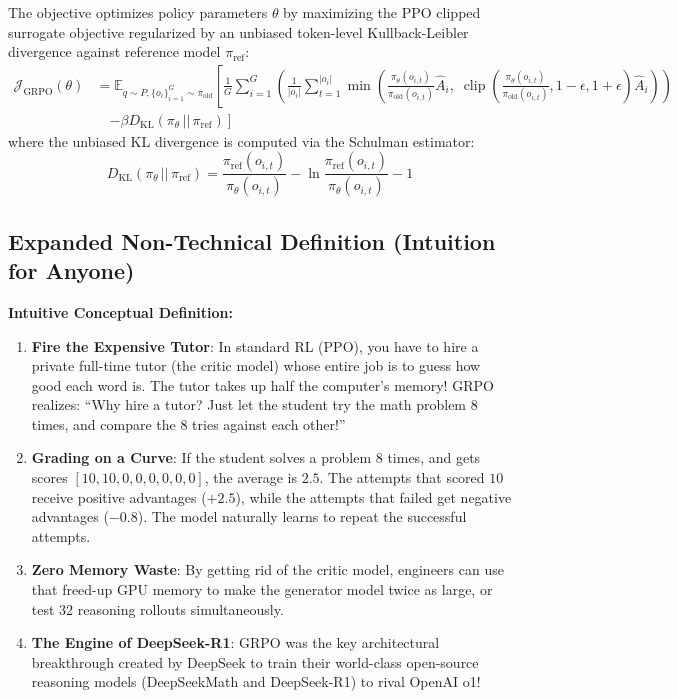 \documentclass[11pt,a4paper]{article}
\theoremstyle{definition}
\begin{document}
The objective optimizes policy parameters $\theta$ by maximizing the PPO clipped surrogate objective regularized by an unbiased token-level Kullback-Leibler divergence against reference model $\pi_{\text{ref}}$:
{\boldmath
\begin{align}
\mathcal{J}_{\text{GRPO}}(\theta) &= \mathbb{E}_{q \sim P, \{o_i\}_{i=1}^G \sim \pi_{\text{old}}} \left[ \frac{1}{G}\sum_{i=1}^G \left( \frac{1}{|o_i|}\sum_{t=1}^{|o_i|} \min\left( \frac{\pi_\theta(o_{i, t})}{\pi_{\text{old}}(o_{i, t})} \hat{A}_i, \; \operatorname{clip}\left(\frac{\pi_\theta(o_{i, t})}{\pi_{\text{old}}(o_{i, t})}, 1 - \epsilon, 1 + \epsilon\right) \hat{A}_i \right) \right) \right. \nonumber \\
&\quad \left. - \beta D_{\text{KL}}(\pi_\theta \,||\, \pi_{\text{ref}}) \right]
\end{align}
}
where the unbiased KL divergence is computed via the Schulman estimator:
{\boldmath
\begin{equation}
D_{\text{KL}}(\pi_\theta \,||\, \pi_{\text{ref}}) = \frac{\pi_{\text{ref}}(o_{i, t})}{\pi_\theta(o_{i, t})} - \ln \frac{\pi_{\text{ref}}(o_{i, t})}{\pi_\theta(o_{i, t})} - 1
\end{equation}
}

\subsection{Expanded Non-Technical Definition (Intuition for Anyone)}
\textbf{Intuitive Conceptual Definition:}
\begin{enumerate}
    \item \textbf{Fire the Expensive Tutor}: In standard RL (PPO), you have to hire a private full-time tutor (the critic model) whose entire job is to guess how good each word is. The tutor takes up half the computer's memory! GRPO realizes: ``Why hire a tutor? Just let the student try the math problem 8 times, and compare the 8 tries against each other!''
    \item \textbf{Grading on a Curve}: If the student solves a problem 8 times, and gets scores $[10, 10, 0, 0, 0, 0, 0, 0]$, the average is $2.5$. The attempts that scored $10$ receive positive advantages ($+2.5$), while the attempts that failed get negative advantages ($-0.8$). The model naturally learns to repeat the successful attempts.
    \item \textbf{Zero Memory Waste}: By getting rid of the critic model, engineers can use that freed-up GPU memory to make the generator model twice as large, or test 32 reasoning rollouts simultaneously.
    \item \textbf{The Engine of DeepSeek-R1}: GRPO was the key architectural breakthrough created by DeepSeek to train their world-class open-source reasoning models (DeepSeekMath and DeepSeek-R1) to rival OpenAI o1!
\end{enumerate}
\end{document}
